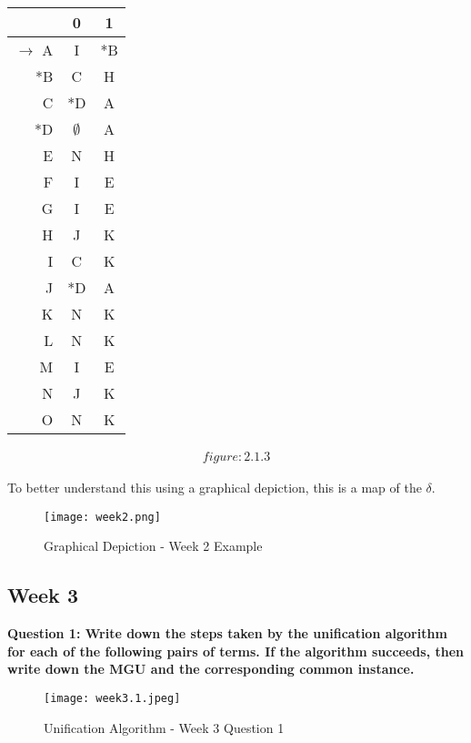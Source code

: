 \documentclass{article}
\theoremstyle{theorem}
\theoremstyle{definition}
\theoremstyle{remark}
\begin{document}
\begin{table}[h!] %
\centering
\begin{tabular}{r||c|c}
    & 0 & 1 \\
    \hline
    $\rightarrow$ A & I & *B \\
    *B & C & H \\
    C & *D & A \\
    *D & $\emptyset$ & A \\
    E & N & H \\
    F & I & E \\
    G & I & E \\
    H & J & K \\
    I & C & K \\
    J & *D & A \\
    K & N & K \\
    L & N & K \\
    M & I & E \\
    N & J & K \\
    O & N & K \\
\end{tabular}
\begin{align*}
figure:2.1.3
\end{align*}
\end{table}


\pagebreak
\medskip\noindent
To better understand this using a graphical depiction, this is a map of the $\delta$.

\begin{figure}[h!]
    \centering
    \texttt{[image: week2.png]}
    \caption{Graphical Depiction - Week 2 Example}
    \label{fig:Graphical Depiction - Week 2 Example}
\end{figure}

\pagebreak

\subsection{Week 3}
\textbf{Question 1: Write down the steps taken by the unification algorithm for each
of the following pairs of terms. If the algorithm succeeds, then write down the
MGU and the corresponding common instance.}
\begin{figure}[h!]
    \centering
    \texttt{[image: week3.1.jpeg]}
    \caption{Unification Algorithm - Week 3 Question 1}
    \label{fig:Unification Algorithm - Week 3 Question 1}
\end{figure}
\end{document}

